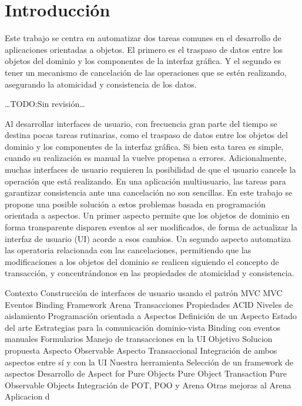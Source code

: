 \section{Introducción}

Este trabajo se centra en automatizar dos tareas comunes en el desarrollo
de aplicaciones orientadas a objetos. El primero es el traspaso de datos
entre los objetos del dominio y los componentes de la interfaz gráfica. Y el
segundo es tener un mecanismo de cancelación de las operaciones que se estén
realizando, asegurando la atomicidad y consistencia de los datos.



\ldots TODO:Sin revisión\ldots


Al desarrollar interfaces de usuario, con frecuencia gran parte del tiempo se
destina pocas tareas rutinarias, como el traspaso de datos entre los objetos
del dominio y los componentes de la interfaz gráfica. Si bien esta tarea es
simple, cuando su realización es manual la vuelve propensa a errores.
Adicionalmente, muchas interfaces de usuario requieren la posibilidad de que el
usuario cancele la operación que está realizando. En una aplicación
multiusuario, las tareas para garantizar consistencia ante una cancelación no
son sencillas. En este trabajo se propone una posible solución a estos
problemas basada en programación orientada a aspectos. Un primer aspecto
permite que los objetos de dominio en forma transparente disparen eventos al
ser modificados, de forma de actualizar la interfaz de usuario (UI) acorde a
esos cambios. Un segundo aspecto automatiza las operatoria relacionada con las
cancelaciones, permitiendo que las modificaciones a los objetos del dominio se
realicen siguiendo el concepto de transacción, y concentrándonos en las
propiedades de atomicidad y consistencia.


Contexto
	Construcción de interfaces de usuario usando el patrón MVC
		MVC
		Eventos
		Binding
		Framework Arena
	Transacciones
		Propiedades ACID
		Niveles de aislamiento
	Programación orientada a Aspectos
		Definición de un Aspecto
Estado del arte
	Estrategias para la comunicación dominio-vista
		Binding con eventos manuales
		Formularios
	Manejo de transacciones en la UI
Objetivo
Solucion propuesta
	Aspecto Observable
 	Aspecto Transaccional
 	Integración de ambos aspectos entre sí y con la UI 
Nuestra herramienta
	Selección de un framework de aspectos
 	Desarrollo de Aspect for Pure Objects
 	Pure Object Transaction
 	Pure Observable Objects
 	Integración de POT, POO y Arena
  	Otras mejoras al Arena 
Aplicacion d 	